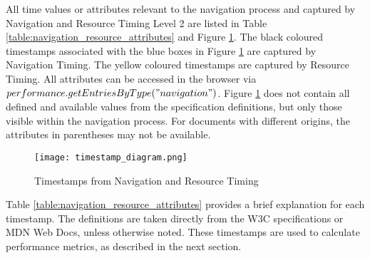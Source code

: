 All time values or attributes relevant to the navigation process and captured by Navigation and Resource Timing Level 2 are listed in Table \ref{table:navigation_resource_attributes} and Figure \ref{figure:navigation_resource_timestamps}.
The black coloured timestamps associated with the blue boxes in Figure \ref{figure:navigation_resource_timestamps} are captured by Navigation Timing.
The yellow coloured timestamps are captured by Resource Timing.
All attributes can be accessed in the browser via $performance.getEntriesByType("navigation")$.
Figure \ref{figure:navigation_resource_timestamps} does not contain all defined and available values from the specification definitions, but only those visible within the navigation process.
For documents with different origins, the attributes in parentheses may not be available. %


\begin{figure}[h!]
\begin{center}
\texttt{[image: timestamp\_diagram.png]}
\caption{Timestamps from Navigation and Resource Timing}
\label{figure:navigation_resource_timestamps}
\end{center}
\end{figure}


Table \ref{table:navigation_resource_attributes} provides a brief explanation for each timestamp.
The definitions are taken directly from the W3C specifications or MDN Web Docs, unless otherwise noted.
These timestamps are used to calculate performance metrics, as described in the next section.



